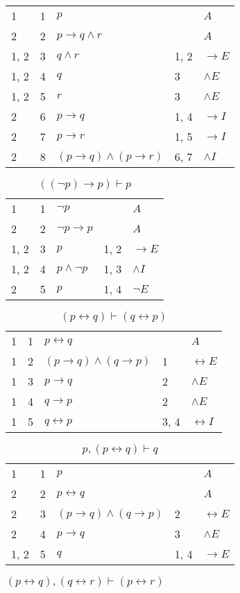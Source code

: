 \documentclass{article}
\begin{document}
\begin{table}[htbp]
\begin{tabular}{lrlll}
{1} & 1 & $p$ & {} & $A$ \\
{2} & 2 & $p→q∧r$ & {} & $A$ \\
{1, 2} & 3 & $q∧r$ & {1, 2} & $→E$ \\
{1, 2} & 4 & $q$ & {3} & $∧E$ \\
{1, 2} & 5 & $r$ & {3} & $∧E$ \\
{2} & 6 & $p→q$ & {1, 4} & $→I$ \\
{2} & 7 & $p→r$ & {1, 5} & $→I$ \\
{2} & 8 & $(p→q)∧(p→r)$ & {6, 7} & $∧I$ \\
\end{tabular}
\end{table}\begin{table}[htbp]\caption*{$((¬p)→p) ⊢ p$}\centering\begin{tabular}{lrlll}
{1} & 1 & $¬p$ & {} & $A$ \\
{2} & 2 & $¬p→p$ & {} & $A$ \\
{1, 2} & 3 & $p$ & {1, 2} & $→E$ \\
{1, 2} & 4 & $p∧ ¬p$ & {1, 3} & $∧I$ \\
{2} & 5 & $p$ & {1, 4} & $¬E$ \\
\end{tabular}
\end{table}\begin{table}[htbp]\caption*{$(p↔q) ⊢ (q↔p)$}\centering\begin{tabular}{lrlll}
{1} & 1 & $p↔q$ & {} & $A$ \\
{1} & 2 & $(p→q)∧(q→p)$ & {1} & $↔E$ \\
{1} & 3 & $p→q$ & {2} & $∧E$ \\
{1} & 4 & $q→p$ & {2} & $∧E$ \\
{1} & 5 & $q↔p$ & {3, 4} & $↔I$ \\
\end{tabular}
\end{table}\begin{table}[htbp]\caption*{$p,(p↔q) ⊢ q$}\centering\begin{tabular}{lrlll}
{1} & 1 & $p$ & {} & $A$ \\
{2} & 2 & $p↔q$ & {} & $A$ \\
{2} & 3 & $(p→q)∧(q→p)$ & {2} & $↔E$ \\
{2} & 4 & $p→q$ & {3} & $∧E$ \\
{1, 2} & 5 & $q$ & {1, 4} & $→E$ \\
\end{tabular}
\end{table}\begin{table}[htbp]\caption*{$(p↔q),(q↔r) ⊢ (p↔r)$}\centering\begin{tabular}{lrlll}

\end{tabular}
\end{table}
\end{document}
